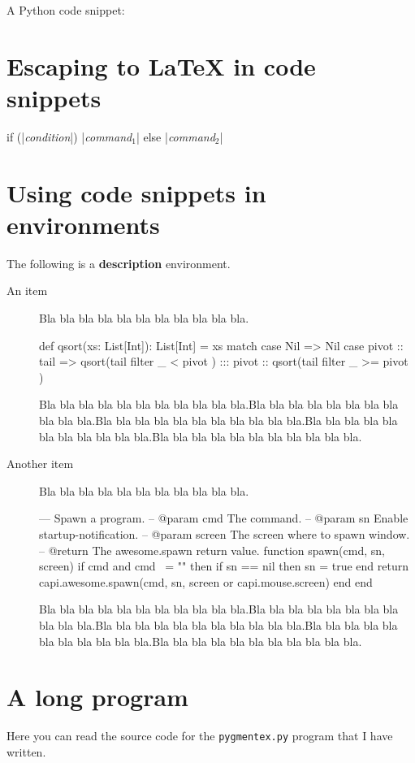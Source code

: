 \documentclass[10pt]{article}
\def\a{Bla bla bla bla bla bla bla bla bla bla bla.}
\def\b{\a\a\a\a\a}
\begin{document}
A Python code snippet:


\section{Escaping to \LaTeX{} in code snippets}

\begin{pygmented}[lang=c,sty=manni,escapeinside=||,
  ]
if (|\textit{condition}|)
  |\textit{command$_1$}|
else
  |\textit{command$_2$}|
\end{pygmented}


\section{Using code snippets in environments}

The following is a \textbf{description} environment.

\begin{description}
  \item[An item] \a
  \begin{pygmented}[lang=scala,colback=yellow,
    ]
def qsort(xs: List[Int]): List[Int] =
  xs match {
    case Nil =>
      Nil
    case pivot :: tail =>
      qsort(tail filter { _ < pivot }) :::
        pivot :: qsort(tail filter { _ >= pivot })
  }
  \end{pygmented}
  \b
  
  \item[Another item] \a
  \begin{pygmented}[lang=lua,colback=yellow]
--- Spawn a program.
-- @param cmd The command.
-- @param sn Enable startup-notification.
-- @param screen The screen where to spawn window.
-- @return The awesome.spawn return value.
function spawn(cmd, sn, screen)
    if cmd and cmd ~= "" then
        if sn == nil then sn = true end
        return capi.awesome.spawn(cmd, sn, screen or capi.mouse.screen)
    end
end
  \end{pygmented}
  \b
\end{description}

\section{A long program}

Here you can read the source code for the \texttt{pygmentex.py} program
that I have written.
\end{document}
